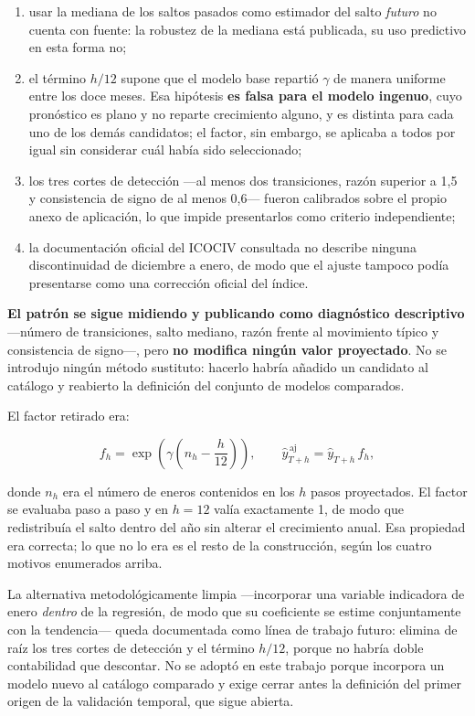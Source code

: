 \documentclass[12pt,letterpaper]{article}
\newcommand{\ICOCIV}{ICOCIV}
\begin{document}
\begin{enumerate}
  \item usar la mediana de los saltos pasados como estimador del salto
  \emph{futuro} no cuenta con fuente: la robustez de la mediana está publicada,
  su uso predictivo en esta forma no;
  \item el término \(h/12\) supone que el modelo base repartió \(\gamma\) de
  manera uniforme entre los doce meses. Esa hipótesis \textbf{es falsa para el
  modelo ingenuo}, cuyo pronóstico es plano y no reparte crecimiento alguno, y
  es distinta para cada uno de los demás candidatos; el factor, sin embargo, se
  aplicaba a todos por igual sin considerar cuál había sido seleccionado;
  \item los tres cortes de detección ---al menos dos transiciones, razón
  superior a 1,5 y consistencia de signo de al menos 0,6--- fueron calibrados
  sobre el propio anexo de aplicación, lo que impide presentarlos como criterio
  independiente;
  \item la documentación oficial del \ICOCIV{} consultada no describe ninguna
  discontinuidad de diciembre a enero, de modo que el ajuste tampoco podía
  presentarse como una corrección oficial del índice.
\end{enumerate}

\textbf{El patrón se sigue midiendo y publicando como diagnóstico descriptivo}
---número de transiciones, salto mediano, razón frente al movimiento típico y
consistencia de signo---, pero \textbf{no modifica ningún valor proyectado}. No
se introdujo ningún método sustituto: hacerlo habría añadido un candidato al
catálogo y reabierto la definición del conjunto de modelos comparados.

El factor retirado era:

\begin{equation}
f_h=\exp\!\left(\gamma\left(n_h-\frac{h}{12}\right)\right),\qquad \hat{y}^{\,\text{aj}}_{T+h}=\hat{y}_{T+h}\, f_h,
\label{eq:factor_calendario}
\end{equation}

donde \(n_h\) era el número de eneros contenidos en los \(h\) pasos proyectados.
El factor se evaluaba paso a paso y en \(h=12\) valía exactamente 1, de modo que
redistribuía el salto dentro del año sin alterar el crecimiento anual. Esa
propiedad era correcta; lo que no lo era es el resto de la construcción, según
los cuatro motivos enumerados arriba.

La alternativa metodológicamente limpia ---incorporar una variable indicadora de
enero \emph{dentro} de la regresión, de modo que su coeficiente se estime
conjuntamente con la tendencia--- queda documentada como línea de trabajo
futuro: elimina de raíz los tres cortes de detección y el término \(h/12\),
porque no habría doble contabilidad que descontar. No se adoptó en este trabajo
porque incorpora un modelo nuevo al catálogo comparado y exige cerrar antes la
definición del primer origen de la validación temporal, que sigue abierta.
\end{document}
